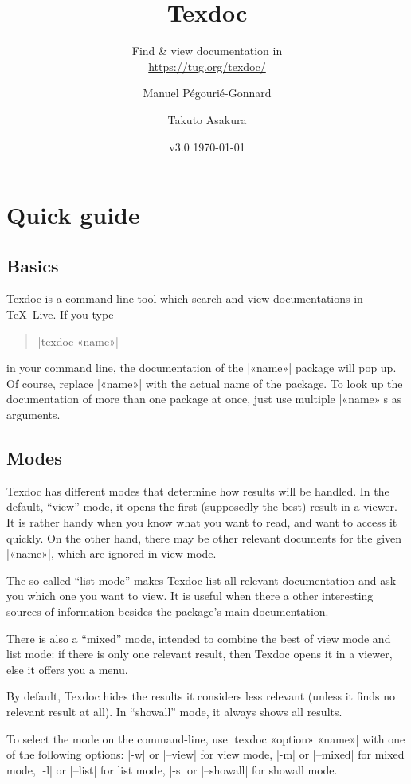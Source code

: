 \documentclass[a4paper, oneside]{scrartcl}
\title{Texdoc}
\subtitle{Find \& view documentation in \texlive\\
  \href{https://tug.org/texdoc/}{https://tug.org/texdoc/}}
\author{Manuel Pégourié-Gonnard\and Takuto Asakura}
\date{v3.0 \today}
\newcommand\texlive{\TeX~Live\xspace}
\begin{document}
\VerbatimFootnotes

\maketitle

\section{Quick guide}

\subsection{Basics}

Texdoc is a command line tool which search and view documentations in \texlive.
If you type
%
\begin{quote}
|texdoc «name»|
\end{quote}
%
in your command line, the documentation of the |«name»| package will pop up. Of
course, replace |«name»| with the actual name of the package.  To look up the
documentation of more than one package at once, just use multiple |«name»|s as
arguments.

\subsection{Modes}\label{ss-modes}

Texdoc has different modes that determine how results will be handled. In the
default, ``view'' mode, it opens the first (supposedly the best) result in a
viewer. It is rather handy when you know what you want to read, and want to
access it quickly. On the other hand, there may be other relevant documents
for the given |«name»|, which are ignored in view mode.

The so-called ``list mode'' makes Texdoc list all relevant documentation and
ask you which one you want to view. It is useful when there a other
interesting sources of information besides the package's main documentation.

There is also a ``mixed'' mode, intended to combine the best of view mode and
list mode: if there is only one relevant result, then Texdoc opens it in a
viewer, else it offers you a menu.

By default, Texdoc hides the results it considers less relevant (unless it
finds no relevant result at all). In ``showall'' mode, it always shows all
results.

To select the mode on the command-line, use |texdoc «option» «name»| with one
of the following options: |-w| or |--view| for view mode, |-m| or |--mixed|
for mixed mode, |-l| or |--list| for list mode, |-s| or |--showall| for
showall mode.
\end{document}
